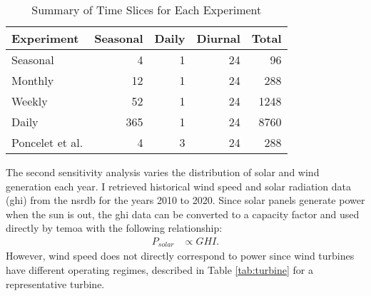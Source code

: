 \begin{table}[H]
  \centering
  \caption{Summary of Time Slices for Each Experiment}
  \label{tab:time-slice}
  \begin{tabular}{lrrrr}
    \toprule
    Experiment & Seasonal & Daily & Diurnal & Total\\
    \midrule
    Seasonal & 4 & 1 & 24 & 96\\
    Monthly & 12 & 1 & 24 & 288\\
    Weekly & 52 & 1 & 24 & 1248\\
    Daily & 365 & 1 & 24 & 8760\\
    \midrule
    Poncelet et al. \cite{poncelet_impact_2016} & 4 & 3 &  24 & 288\\
    \bottomrule
  \end{tabular}
\end{table}

The second sensitivity analysis varies the distribution of solar and wind generation
each year. I retrieved historical wind speed and solar radiation data (\gls{ghi})
from the \gls{nsrdb} \cite{sengupta_national_2018} for the years 2010 to 2020.
Since solar panels generate power when the sun is out, the \gls{ghi} data can be
converted to a capacity factor and used directly by \gls{temoa} with the following
relationship:
\begin{align}
  P_{solar} &\propto GHI.
\end{align}
However,
wind speed does not directly correspond to power since wind turbines have different
operating regimes, described in Table \ref{tab:turbine} for a representative turbine.

\begin{table}[H]
  \centering
  \caption{Summary of Wind Turbine Data from \cite{general_electric_15_2013}}
  \label{tab:turbine}

\end{table}

